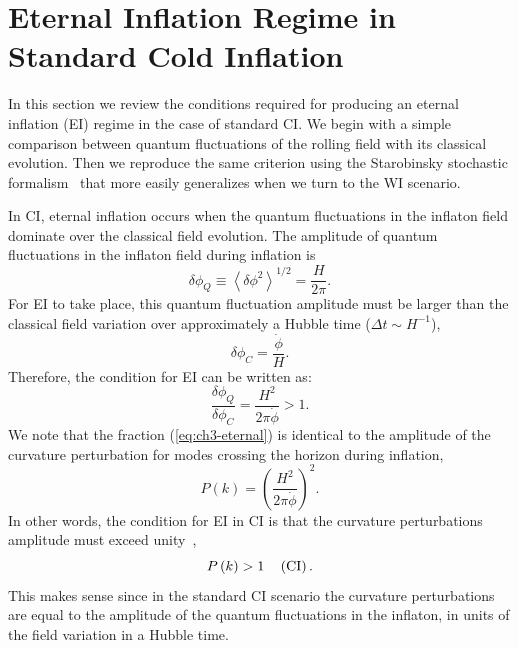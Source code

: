\section{Eternal Inflation Regime in Standard Cold Inflation }
\label{sec:ch3-EICI}

In this section we review the conditions required for producing an eternal inflation (EI) regime in the case of standard CI. We begin with a simple comparison between quantum fluctuations of the rolling field with its classical evolution. Then we reproduce the same criterion using the Starobinsky stochastic formalism~\cite{Starobinsky:1986fx} that more easily generalizes when we turn to the WI scenario.

In CI, eternal inflation occurs when the quantum fluctuations in the inflaton field dominate over the classical field evolution.  The amplitude of quantum fluctuations in the inflaton field during inflation is
\begin{equation}
\delta\phi_Q \equiv \left\langle \delta \phi^2\right\rangle^{1/2} = \frac{H}{2 \pi}.
\end{equation}
For EI to take place, this quantum fluctuation amplitude must be larger than the classical field variation over approximately a Hubble time ($\Delta t\sim
H^{-1}$),
\begin{equation}
\delta\phi_C = \frac{\dot\phi}{H}.
\end{equation}
Therefore, the condition for EI can be written as:
\begin{equation}
\frac{\delta\phi_Q}{\delta\phi_C} = \frac{H^2}{2 \pi \dot\phi} > 1.\label{eq:ch3-eternal}
\end{equation}
We note that the fraction (\ref{eq:ch3-eternal}) is identical to the amplitude of the curvature perturbation for modes crossing the horizon during inflation,
\begin{equation}
P\left(k\right) =\left(\frac{H^2}{2\pi\dot{\phi}}\right)^2. \label{eq:ch3-DeltaR2_CI}
\end{equation}
In other words, the condition for EI in CI is that the curvature perturbations amplitude must
exceed unity~\cite{Goncharov:1987ir,Guth:2007ng,Kinney:2014jya},
\begin{equation}
\label{eq:ch3-FDR_CI}
P\left(k\right) > 1 \,\,\,\,\,\,\,   ({\rm
 CI}) \, .
\end{equation}
This makes sense since in the standard CI scenario the
curvature perturbations are equal to the amplitude of the quantum fluctuations in the inflaton,
in units of the field variation in a Hubble time.


